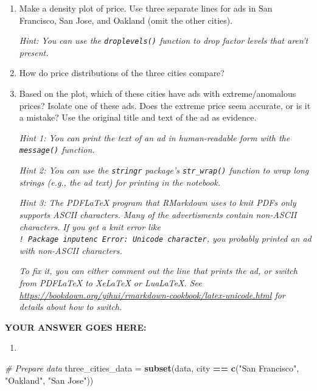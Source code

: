 \documentclass[
]{article}
\newenvironment{Shaded}{\begin{snugshade}}{\end{snugshade}}
\newcommand{\CommentTok}[1]{\textcolor[rgb]{0.56,0.35,0.01}{\textit{#1}}}
\newcommand{\KeywordTok}[1]{\textcolor[rgb]{0.13,0.29,0.53}{\textbf{#1}}}
\newcommand{\NormalTok}[1]{#1}
\newcommand{\OperatorTok}[1]{\textcolor[rgb]{0.81,0.36,0.00}{\textbf{#1}}}
\newcommand{\StringTok}[1]{\textcolor[rgb]{0.31,0.60,0.02}{#1}}
\providecommand{\tightlist}{%
  \setlength{\itemsep}{0pt}\setlength{\parskip}{0pt}}
\begin{document}
\begin{enumerate}
\def\labelenumi{\arabic{enumi}.}
\item
  Make a density plot of price. Use three separate lines for ads in San
  Francisco, San Jose, and Oakland (omit the other cities).

  \emph{Hint: You can use the \texttt{droplevels()} function to drop
  factor levels that aren't present.}
\item
  How do price distributions of the three cities compare?
\item
  Based on the plot, which of these cities have ads with
  extreme/anomalous prices? Isolate one of these ads. Does the extreme
  price seem accurate, or is it a mistake? Use the original title and
  text of the ad as evidence.

  \emph{Hint 1: You can print the text of an ad in human-readable form
  with the \texttt{message()} function.}

  \emph{Hint 2: You can use the \texttt{stringr} package's
  \texttt{str\_wrap()} function to wrap long strings (e.g., the ad text)
  for printing in the notebook.}

  \emph{Hint 3: The PDFLaTeX program that RMarkdown uses to knit PDFs
  only supports ASCII characters. Many of the advertisments contain
  non-ASCII characters. If you get a knit error like
  \texttt{!\ Package\ inputenc\ Error:\ Unicode\ character}, you
  probably printed an ad with non-ASCII characters.}

  \emph{To fix it, you can either comment out the line that prints the
  ad, or switch from PDFLaTeX to XeLaTeX or LuaLaTeX. See
  \url{https://bookdown.org/yihui/rmarkdown-cookbook/latex-unicode.html}
  for details about how to switch.}
\end{enumerate}

\textbf{YOUR ANSWER GOES HERE:}

\begin{enumerate}
\def\labelenumi{\arabic{enumi}.}
\tightlist
\item
\end{enumerate}

\begin{Shaded}
\begin{Highlighting}[]
\CommentTok{\# Prepare data}
\NormalTok{three\_cities\_data =}\StringTok{ }\KeywordTok{subset}\NormalTok{(data, city }\OperatorTok{==}\StringTok{ }\KeywordTok{c}\NormalTok{(}\StringTok{"San Francisco"}\NormalTok{, }\StringTok{"Oakland"}\NormalTok{, }\StringTok{"San Jose"}\NormalTok{))}
\end{Highlighting}
\end{Shaded}
\end{document}
